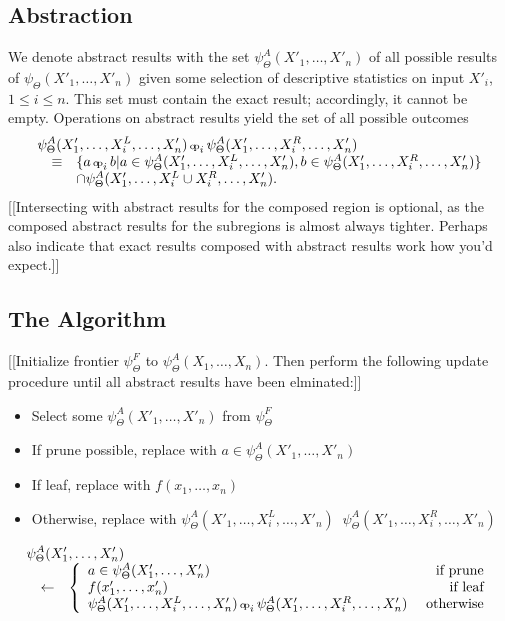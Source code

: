 \documentclass{article}
\newcommand{\opsym}{{\scriptstyle \mathrm{o\!p}}}
\newcommand{\opcurry}[3][]{\mathop{\opsym^{#1}_{#2}{#3}}}
\newcommand{\op}[2][]{\opcurry[#1]{#2}{}}
\newcommand{\GNP}{\psi_{\Theta}}
\begin{document}
\subsection{Abstraction}

We denote abstract results with the set $\GNP^A(X'_1,\ldots,X'_n)$ of
all possible results of $\GNP(X'_1,\ldots,X'_n)$ given some selection
of descriptive statistics on input $X'_i$, $1 \leq i \leq n$.  This
set must contain the exact result; accordingly, it cannot be empty.
Operations on abstract results yield the set of all possible outcomes
\[
\begin{array}{rcl}
  \lefteqn{\GNP^A(X'_1,\ldots,X^L_i,\ldots,X'_n) \op{i} \GNP^A(X'_1,\ldots,X^R_i,\ldots,X'_n)} \\
  & \equiv & \{a \op{i} b | a \in \GNP^A(X'_1,\ldots,X^L_i,\ldots,X'_n), b \in \GNP^A(X'_1,\ldots,X^R_i,\ldots,X'_n)\} \\
  & & \cap \GNP^A(X'_1,\ldots,X^L_i \cup X^R_i,\ldots,X'_n).
\end{array}
\]
[[Intersecting with abstract results for the composed region is
optional, as the composed abstract results for the subregions is
almost always tighter.  Perhaps also indicate that exact results
composed with abstract results work how you'd expect.]]

\subsection{The Algorithm}

[[Initialize frontier $\GNP^F$ to $\GNP^A(X_1,\ldots,X_n)$.  Then
perform the following update procedure until all abstract results have
been elminated:]]

\begin{itemize}
\item Select some $\GNP^A(X'_1,\ldots,X'_n)$ from $\GNP^F$
\item If prune possible, replace with $a \in \GNP^A(X'_1,\ldots,X'_n)$
\item If leaf, replace with $f(x_1,\ldots,x_n)$
\item Otherwise, replace with $\GNP^A(X'_1,\ldots,X^L_i,\ldots,X'_n) \op{i} \GNP^A(X'_1,\ldots,X^R_i,\ldots,X'_n)$
\end{itemize}

\[
\begin{array}{rcl}
  \lefteqn{\GNP^A(X'_1,\ldots,X'_n)} \\
  & \leftarrow & \left\{
  \begin{array}{lr}
    a \in \GNP^A(X'_1,\ldots,X'_n) & \mbox{ if prune} \\
    f(x'_1,\ldots,x'_n) & \mbox{ if leaf} \\
    \GNP^A(X'_1,\ldots,X^L_i,\ldots,X'_n) \op{i} \GNP^A(X'_1,\ldots,X^R_i,\ldots,X'_n) & \mbox{ otherwise}
  \end{array}
  \right.
\end{array}
\]
\end{document}
